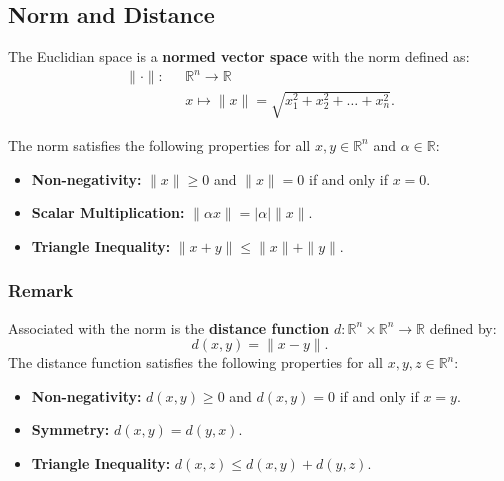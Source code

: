 \documentclass[11pt]{article}
\begin{document}
\subsection{Norm and Distance}
The Euclidian space is a \textbf{normed vector space} with the norm defined as:
\begin{align*}
\|\cdot\| : \text{ } & \mathbb{R}^n \to \mathbb{R} \\
& x \mapsto \|x\| = \sqrt{x_1^2 + x_2^2 + \ldots + x_n^2}.
\end{align*}

The norm satisfies the following properties for all $x, y \in \mathbb{R}^n$ and $\alpha \in \mathbb{R}$:
\begin{itemize}
    \item \textbf{Non-negativity:} $\|x\| \geq 0$ and $\|x\| = 0$ if and only if $x = 0$.
    \item \textbf{Scalar Multiplication:} $\|\alpha x\| = |\alpha| \|x\|$.
    \item \textbf{Triangle Inequality:} $\|x + y\| \leq \|x\| + \|y\|$.
\end{itemize}
\pagebreak
\subsubsection*{Remark}
Associated with the norm is the \textbf{distance function} $d : \mathbb{R}^n \times \mathbb{R}^n \to \mathbb{R}$ defined by:
\[ d(x, y) = \|x - y\|. \]
The distance function satisfies the following properties for all $x, y, z \in \mathbb{R}^n$:
\begin{itemize}
    \item \textbf{Non-negativity:} $d(x, y) \geq 0$ and $d(x, y) = 0$ if and only if $x = y$.
    \item \textbf{Symmetry:} $d(x, y) = d(y, x)$.
    \item \textbf{Triangle Inequality:} $d(x, z) \leq d(x, y) + d(y, z)$.
\end{itemize}
\end{document}
